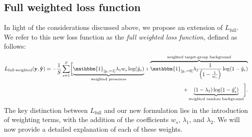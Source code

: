\documentclass[3p,preprint,12pt]{elsarticle}
\begin{document}
\subsection{Full weighted loss function}
\label{sec:fullweightedloss}

In light of the considerations discussed above, we propose an extension of $L_{\text{full}}$. We refer to this new loss function as the \textit{full weighted loss function}, defined as follows:
\begin{align}
    L_{\text{full-weighted}}(\mathbf{y}, \mathbf{\hat{y}}) = - \frac{1}{S} \sum^S_{s=1} \biggl[ \underbrace{\mathbbm{1}_{[y_s=1]} \lambda_1 w_s  \log(\hat{y}_s)}_{\text{weighted presences}}   +  \overbrace{\mathbbm{1}_{[y_s=0]} \lambda_2 \frac{1}{\left(1 - \frac{1}{w_s}\right)}  \log(1 - \hat{y}_s)}^{\text{weighted target-group background}} \nonumber  \\ + \underbrace{(1 - \lambda_2) \log(1 - \hat{y}_s')}_{\text{weighted random background}}\biggr].
\end{align}
The key distinction between $L_{\text{full}}$ and our new formulation lies in the introduction of weighting terms, with the addition of the coefficients $w_s$, $\lambda_1$, and $\lambda_2$. We will now provide a detailed explanation of each of these weights.
\end{document}
